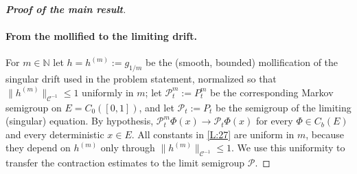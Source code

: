 \documentclass[12pt]{article}
\theoremstyle{definition}
\DeclareMathOperator{\1}{\mathbbm{1}}%
\renewcommand{\le}{\leqslant}
\newcommand{\C}{\mathcal{C}}
\newcommand{\N}{\mathbb{N}}
\newcommand{\PP}{\mathcal{P}}
\begin{document}
\begin{proof}[\textbf{Proof of the main result}]
\paragraph{From the mollified to the limiting drift.}
For $m\in\N$ let $h=h^{(m)}:=g_{1/m}$ be the (smooth, bounded) mollification of the singular
drift used in the problem statement, normalized so that $\|h^{(m)}\|_{\C^{-1}}\le 1$ uniformly
in $m$; let $\PP^{m}_t:=P_t^m$ be the corresponding Markov semigroup on $E=C_0([0,1])$, and let
$\PP_t:=P_t$ be the semigroup of the limiting (singular) equation. By hypothesis,
$\PP^m_t\Phi(x)\to\PP_t\Phi(x)$ for every $\Phi\in C_b(E)$ and every deterministic $x\in E$.
All constants in \cref{L:27} are uniform in $m$, because they depend on $h^{(m)}$ only through
$\|h^{(m)}\|_{\C^{-1}}\le1$. We use this uniformity to transfer the contraction estimates to the
limit semigroup $\PP$.


\end{proof}
\end{document}
